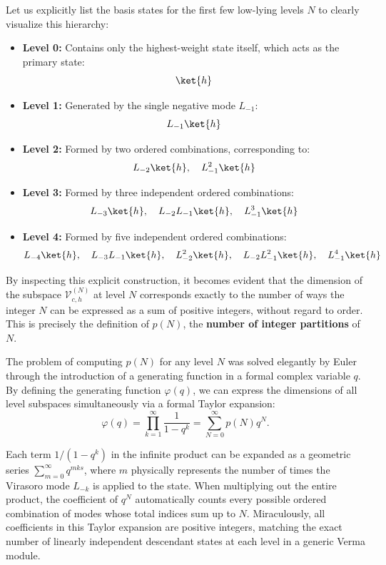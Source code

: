 Let us explicitly list the basis states for the first few low-lying levels \(N\) to clearly visualize this hierarchy:
\begin{itemize}
    \item \textbf{Level 0:} Contains only the highest-weight state itself, which acts as the primary state:
          \[
              \ket{h}
          \]
    \item \textbf{Level 1:} Generated by the single negative mode \(L_{-1}\):
          \[
              L_{-1}\ket{h}
          \]
    \item \textbf{Level 2:} Formed by two ordered combinations, corresponding to:
          \[
              L_{-2}\ket{h}, \quad L_{-1}^2\ket{h}
          \]
    \item \textbf{Level 3:} Formed by three independent ordered combinations:
          \[
              L_{-3}\ket{h}, \quad L_{-2}L_{-1}\ket{h}, \quad L_{-1}^3\ket{h}
          \]
    \item \textbf{Level 4:} Formed by five independent ordered combinations:
          \[
              L_{-4}\ket{h}, \quad L_{-3}L_{-1}\ket{h}, \quad L_{-2}^2\ket{h}, \quad L_{-2}L_{-1}^2\ket{h}, \quad L_{-1}^4\ket{h}
          \]
\end{itemize}

By inspecting this explicit construction, it becomes evident that the dimension of the subspace \(\mathcal{V}_{c,h}^{(N)}\) at level \(N\) corresponds exactly to the number of ways the integer \(N\) can be expressed as a sum of positive integers, without regard to order. This is precisely the definition of \(p(N)\), the \textbf{number of integer partitions} of \(N\).

The problem of computing \(p(N)\) for any level \(N\) was solved elegantly by Euler through the introduction of a generating function in a formal complex variable \(q\). By defining the generating function \(\varphi(q)\), we can express the dimensions of all level subspaces simultaneously via a formal Taylor expansion:
\[
    \varphi(q) = \prod_{k=1}^{\infty} \frac{1}{1 - q^k} = \sum_{N=0}^{\infty} p(N)q^N.
\]

Each term \(1/(1-q^k)\) in the infinite product can be expanded as a geometric series \(\sum_{m=0}^{\infty} q^{mks}\), where \(m\) physically represents the number of times the Virasoro mode \(L_{-k}\) is applied to the state. When multiplying out the entire product, the coefficient of \(q^N\) automatically counts every possible ordered combination of modes whose total indices sum up to \(N\). Miraculously, all coefficients in this Taylor expansion are positive integers, matching the exact number of linearly independent descendant states at each level in a generic Verma module.

